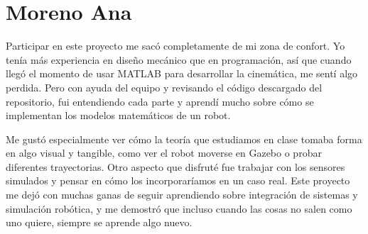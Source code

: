 \section{Moreno Ana}
Participar en este proyecto me sacó completamente de mi zona de confort. Yo tenía más experiencia en diseño mecánico que en programación, así que cuando llegó el momento de usar MATLAB para desarrollar la cinemática, me sentí algo perdida. Pero con ayuda del equipo y revisando el código descargado del repositorio, fui entendiendo cada parte y aprendí mucho sobre cómo se implementan los modelos matemáticos de un robot.

Me gustó especialmente ver cómo la teoría que estudiamos en clase tomaba forma en algo visual y tangible, como ver el robot moverse en Gazebo o probar diferentes trayectorias. Otro aspecto que disfruté fue trabajar con los sensores simulados y pensar en cómo los incorporaríamos en un caso real. Este proyecto me dejó con muchas ganas de seguir aprendiendo sobre integración de sistemas y simulación robótica, y me demostró que incluso cuando las cosas no salen como uno quiere, siempre se aprende algo nuevo.